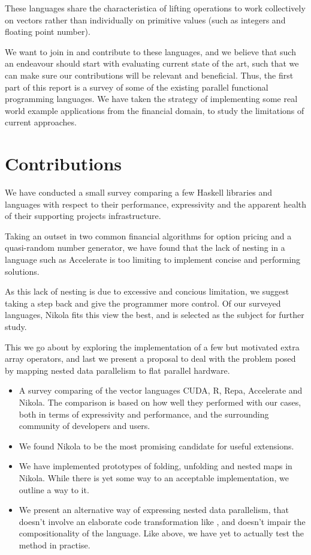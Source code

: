 These languages share the characteristica of lifting operations to
work collectively on vectors rather than individually on primitive
values (such as integers and floating point number).

We want to join in and contribute to these languages, and we believe
that such an endeavour should start with evaluating current state of
the art, such that we can make sure our contributions will be relevant
and beneficial. Thus, the first part of this report is a survey of
some of the existing parallel functional programming languages. We
have taken the strategy of implementing some real world example
applications from the financial domain, to study the limitations of
current approaches.

\section{Contributions}

We have conducted a small survey comparing a few Haskell libraries and
languages with respect to their performance, expressivity and the apparent
health of their supporting projects infrastructure.

Taking an outset in two common financial algorithms for option pricing and a
quasi-random number generator, we have found that the lack of nesting in a
language such as Accelerate is too limiting to implement concise and performing
solutions.

As this lack of nesting is due to excessive and concious limitation, we suggest
taking a step back and give the programmer more control. Of our surveyed
languages, Nikola fits this view the best, and is selected as the subject for
further study.

This we go about by exploring the implementation of a few but motivated extra
array operators, and last we present a proposal to deal with the problem posed
by mapping nested data parallelism to flat parallel hardware.

\begin{itemize}

\item A survey comparing of the vector languages CUDA, R, Repa, Accelerate and
  Nikola. The comparison is based on how well they performed with our cases,
  both in terms of expressivity and performance, and the surrounding community
  of developers and users.

\item We found Nikola to be the most promising candidate for useful extensions.

\item We have implemented prototypes of folding, unfolding and nested maps in
  Nikola. While there is yet some way to an acceptable implementation, we
  outline a way to it.

\item We present an alternative way of expressing nested data parallelism, that
  doesn't involve an elaborate code transformation like \cite{nesl}, and
  doesn't impair the compositionality of the language. Like above, we have yet
  to actually test the method in practise.

\end{itemize}

